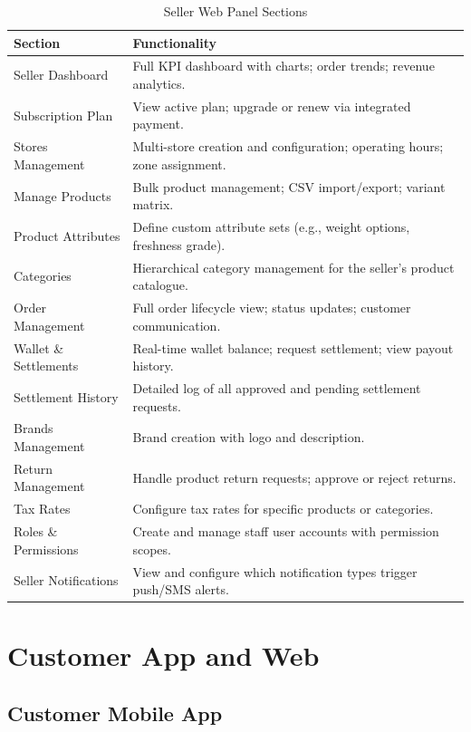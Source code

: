 \documentclass[12pt, a4paper, oneside]{report}
\begin{document}
\begin{table}[H]
\centering
\caption{Seller Web Panel Sections}
\label{tab:seller-panel}
\begin{tabularx}{\textwidth}{@{} L{3.6cm} X @{}}
\toprule
\textbf{Section} & \textbf{Functionality} \\
\midrule
Seller Dashboard    & Full KPI dashboard with charts; order trends; revenue analytics. \\[4pt]
Subscription Plan   & View active plan; upgrade or renew via integrated payment. \\[4pt]
Stores Management   & Multi-store creation and configuration; operating hours; zone assignment. \\[4pt]
Manage Products     & Bulk product management; CSV import/export; variant matrix. \\[4pt]
Product Attributes  & Define custom attribute sets (e.g., weight options, freshness grade). \\[4pt]
Categories          & Hierarchical category management for the seller's product catalogue. \\[4pt]
Order Management    & Full order lifecycle view; status updates; customer communication. \\[4pt]
Wallet \& Settlements & Real-time wallet balance; request settlement; view payout history. \\[4pt]
Settlement History  & Detailed log of all approved and pending settlement requests. \\[4pt]
Brands Management   & Brand creation with logo and description. \\[4pt]
Return Management   & Handle product return requests; approve or reject returns. \\[4pt]
Tax Rates           & Configure tax rates for specific products or categories. \\[4pt]
Roles \& Permissions& Create and manage staff user accounts with permission scopes. \\[4pt]
Seller Notifications& View and configure which notification types trigger push/SMS alerts. \\
\bottomrule
\end{tabularx}
\end{table}

\section{Customer App and Web}

\subsection{Customer Mobile App}
\end{document}
